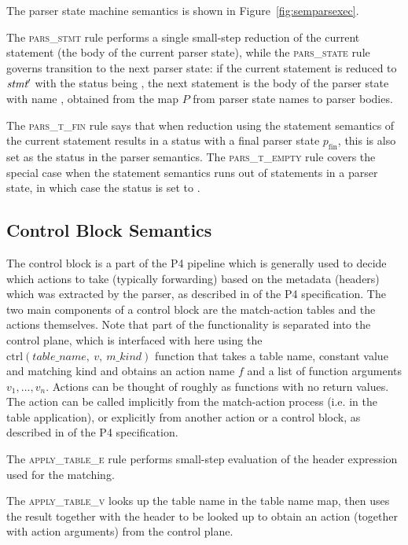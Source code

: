 \documentclass[UTF8]{article}
\begin{document}
The parser state machine semantics is shown in Figure~\ref{fig:semparsexec}.

The \textsc{pars\_stmt} rule performs a single small-step reduction of the current statement (the body of the current parser state), while the \textsc{pars\_state} rule governs transition to the next parser state: if the current statement \stmt{} is reduced to $\textit{stmt}{}'$ with the status being \trans{\vn{}}, the next statement is the body of the parser state with name \vn{}, obtained from the map $P$ from parser state names to parser bodies.

The \textsc{pars\_t\_fin} rule says that when reduction using the statement semantics of the current statement results in a status with a final parser state $p_{\mathrm{fin}}$, this is also set as the status in the parser semantics. The \textsc{pars\_t\_empty} rule covers the special case when the statement semantics runs out of statements in a parser state, in which case the status is set to .

\subsection{Control Block Semantics}
The control block is a part of the P4 pipeline which is generally used to decide which actions to take (typically forwarding) based on the metadata (headers) which was extracted by the parser, as described in  of the P4 specification. The two main components of a control block are the match-action tables and the actions themselves. Note that part of the functionality is separated into the control plane, which is interfaced with here using the $\mathrm{ctrl}(table\_name,\ v,\ m\_kind)$ function that takes a table name, constant value and matching kind and obtains an action name $f$ and a list of function arguments ${v_1}, ..., {v_n}$.
Actions can be thought of roughly as functions with no return values. The action can be called implicitly from the match-action process (i.e. in the table application), or explicitly from another action or a control block, as described in  of the P4 specification.

The \textsc{apply\_table\_e} rule performs small-step evaluation of the header expression used for the matching.

The \textsc{apply\_table\_v} looks up the table name in the table name map, then uses the result together with the header to be looked up to obtain an action (together with action arguments) from the control plane.
\end{document}
